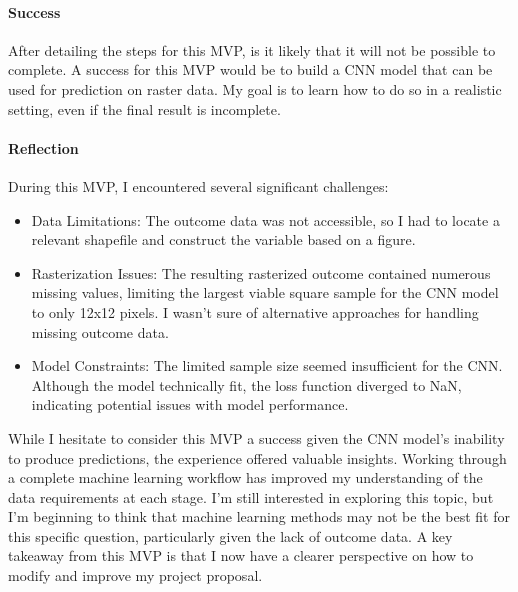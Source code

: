 \documentclass[
  letterpaper,
]{article}
\let\oldparagraph\paragraph
\renewcommand{\paragraph}[1]{\oldparagraph{#1}\mbox{}}
\providecommand{\tightlist}{%
  \setlength{\itemsep}{0pt}\setlength{\parskip}{0pt}}\usepackage{longtable,booktabs,array}
\begin{document}
\paragraph{Success}\label{success}

After detailing the steps for this MVP, is it likely that it will not be
possible to complete. A success for this MVP would be to build a CNN
model that can be used for prediction on raster data. My goal is to
learn how to do so in a realistic setting, even if the final result is
incomplete.

\paragraph{Reflection}\label{reflection}

During this MVP, I encountered several significant challenges:

\begin{itemize}
\tightlist
\item
  Data Limitations: The outcome data was not accessible, so I had to
  locate a relevant shapefile and construct the variable based on a
  figure.
\item
  Rasterization Issues: The resulting rasterized outcome contained
  numerous missing values, limiting the largest viable square sample for
  the CNN model to only 12x12 pixels. I wasn't sure of alternative
  approaches for handling missing outcome data.
\item
  Model Constraints: The limited sample size seemed insufficient for the
  CNN. Although the model technically fit, the loss function diverged to
  NaN, indicating potential issues with model performance.
\end{itemize}

While I hesitate to consider this MVP a success given the CNN model's
inability to produce predictions, the experience offered valuable
insights. Working through a complete machine learning workflow has
improved my understanding of the data requirements at each stage. I'm
still interested in exploring this topic, but I'm beginning to think
that machine learning methods may not be the best fit for this specific
question, particularly given the lack of outcome data. A key takeaway
from this MVP is that I now have a clearer perspective on how to modify
and improve my project proposal.
\end{document}
